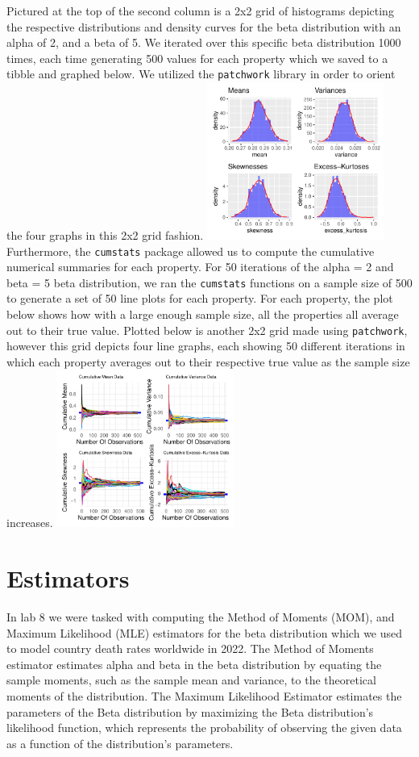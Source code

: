 \documentclass{article}\usepackage[]{graphicx}\usepackage[]{xcolor}
\begin{document}
\begin{multicols}{2}
Pictured at the top of the second column is a 2x2 grid of histograms depicting the respective distributions and density curves for the beta distribution with an alpha of 2, and a beta of 5. We iterated over this specific beta distribution 1000 times, each time generating 500 values for each property which we saved to a tibble and graphed below. We utilized the \texttt{patchwork} \citep{patchwork} library in order to orient the four graphs in this 2x2 grid fashion.
\includegraphics[width=0.435\textwidth]{2x2Plot.pdf}
\newline \newline \indent 
Furthermore, the  \texttt{cumstats} \citep{cumstats} package allowed us to compute the cumulative numerical summaries for each property. For 50 iterations of the alpha = 2 and beta = 5 beta distribution, we ran the \texttt{cumstats} functions on a sample size of 500 to generate a set of 50 line plots for each property. For each property, the plot below shows how with a large enough sample size, all the properties all average out to their true value. Plotted below is another 2x2 grid made using \texttt{patchwork}, however this grid depicts four line graphs, each showing 50 different iterations in which each property averages out to their respective true value as the sample size increases. 
\includegraphics[width=0.435\textwidth]{2x2Grid2.pdf}
\section{Estimators}
In lab 8 we were tasked with computing the Method of Moments (MOM), and Maximum Likelihood (MLE) estimators for the beta distribution which we used to model country death rates worldwide in 2022. The Method of Moments estimator estimates alpha and beta in the beta distribution by equating the sample moments, such as the sample mean and variance, to the theoretical moments of the distribution. The Maximum Likelihood Estimator estimates the parameters of the Beta distribution by maximizing the Beta distribution's likelihood function, which represents the probability of observing the given data as a function of the distribution's parameters.


\end{multicols}
\end{document}
